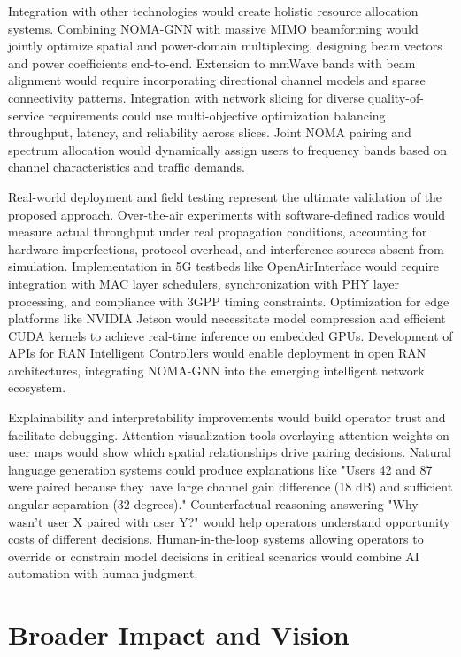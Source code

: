 Integration with other technologies would create holistic resource allocation systems. Combining NOMA-GNN with massive MIMO beamforming would jointly optimize spatial and power-domain multiplexing, designing beam vectors and power coefficients end-to-end. Extension to mmWave bands with beam alignment would require incorporating directional channel models and sparse connectivity patterns. Integration with network slicing for diverse quality-of-service requirements could use multi-objective optimization balancing throughput, latency, and reliability across slices. Joint NOMA pairing and spectrum allocation would dynamically assign users to frequency bands based on channel characteristics and traffic demands.

Real-world deployment and field testing represent the ultimate validation of the proposed approach. Over-the-air experiments with software-defined radios would measure actual throughput under real propagation conditions, accounting for hardware imperfections, protocol overhead, and interference sources absent from simulation. Implementation in 5G testbeds like OpenAirInterface would require integration with MAC layer schedulers, synchronization with PHY layer processing, and compliance with 3GPP timing constraints. Optimization for edge platforms like NVIDIA Jetson would necessitate model compression and efficient CUDA kernels to achieve real-time inference on embedded GPUs. Development of APIs for RAN Intelligent Controllers would enable deployment in open RAN architectures, integrating NOMA-GNN into the emerging intelligent network ecosystem.

Explainability and interpretability improvements would build operator trust and facilitate debugging. Attention visualization tools overlaying attention weights on user maps would show which spatial relationships drive pairing decisions. Natural language generation systems could produce explanations like "Users 42 and 87 were paired because they have large channel gain difference (18 dB) and sufficient angular separation (32 degrees)." Counterfactual reasoning answering "Why wasn't user X paired with user Y?" would help operators understand opportunity costs of different decisions. Human-in-the-loop systems allowing operators to override or constrain model decisions in critical scenarios would combine AI automation with human judgment.

\section{Broader Impact and Vision}

